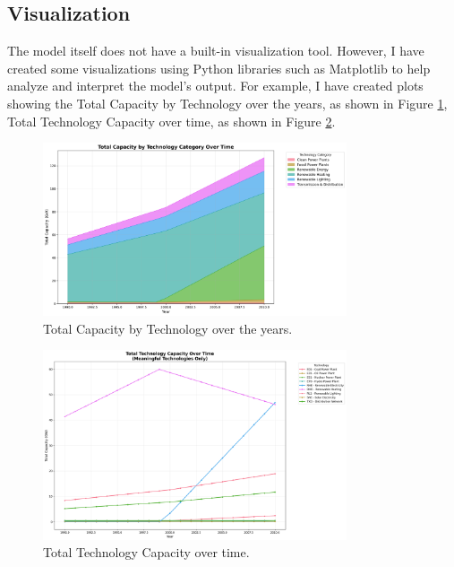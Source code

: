 \documentclass[11pt]{article}
\begin{document}
\subsection{Visualization}
The model itself does not have a built-in visualization tool. However, I have created some visualizations using Python libraries such as Matplotlib to help analyze and interpret the model's output. For example, I have created plots showing the Total Capacity by Technology over the years, as shown in Figure \ref{fig:total_capacity}, Total Technology Capacity over time, as shown in Figure \ref{fig:total_technology_capacity}.
\begin{figure}[H]
    \centering
    \includegraphics[width=0.8\textwidth]{capacity_by_category_labeled.png}
    \caption{Total Capacity by Technology over the years.}
    \label{fig:total_capacity}
\end{figure}

\begin{figure}[H]
    \centering
    \includegraphics[width=0.8\textwidth]{meaningful_total_capacity_labeled.png}
    \caption{Total Technology Capacity over time.}
    \label{fig:total_technology_capacity}
\end{figure}
\end{document}
